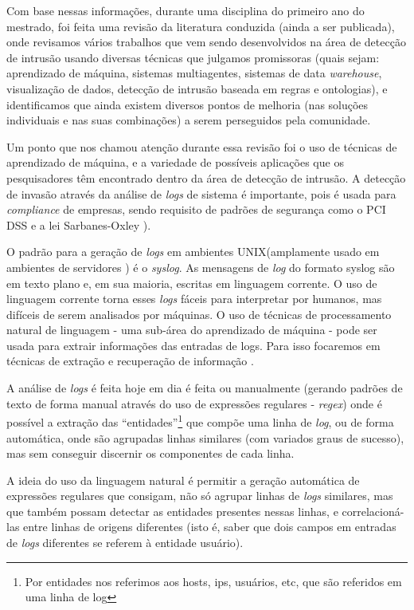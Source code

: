 \documentclass[
	12pt,				%
	openright,			%
	twoside,			%
	a4paper,			%
	english,			%
	french,				%
	spanish,			%
	brazil,				%
	]{abntex2}
\begin{document}
Com base nessas informações, durante uma disciplina do primeiro ano do mestrado, foi feita uma revisão da literatura conduzida (ainda a ser publicada), onde revisamos vários trabalhos que vem sendo desenvolvidos na área de detecção de intrusão usando diversas técnicas que julgamos promissoras (quais sejam: aprendizado de máquina, sistemas multiagentes, sistemas de data \emph{warehouse}, visualização de dados, detecção de intrusão baseada em regras e ontologias), e identificamos que ainda existem diversos pontos de melhoria (nas soluções individuais e nas suas combinações) a serem perseguidos pela comunidade.

Um ponto que nos chamou atenção durante essa revisão foi o uso de técnicas de aprendizado de máquina, e a variedade de possíveis aplicações que os pesquisadores têm encontrado dentro da área de detecção de intrusão. A detecção de invasão através da análise de \emph{logs} de sistema é importante, pois é usada para \emph{compliance} de empresas, sendo requisito de padrões de segurança como o PCI DSS e a lei Sarbanes-Oxley \cite{prakhar2012log}).

O padrão para a geração de \emph{logs} em ambientes UNIX\texttrademark (amplamente usado em ambientes de servidores \cite{w3techs-osusage}) é o \emph{syslog}. As mensagens de \emph{log} do formato syslog são em texto plano e, em sua maioria, escritas em linguagem corrente. O uso de linguagem corrente torna esses \emph{logs} fáceis para interpretar por humanos, mas difíceis de serem analisados por máquinas. O uso de técnicas de processamento natural de linguagem - uma sub-área do aprendizado de máquina - pode ser usada para extrair informações das entradas de logs. Para isso focaremos em técnicas de extração e recuperação de informação \cite{bird2009natural,manning2008introduction}.

A análise de \emph{logs} é feita hoje em dia é feita ou manualmente (gerando padrões de texto de forma manual através do uso de expressões regulares - \emph{regex}) onde é possível a extração das ``entidades''\footnote{Por entidades nos referimos aos hosts, ips, usuários, etc, que são referidos em uma linha de log} que compõe uma linha de \emph{log}, ou de forma automática, onde são agrupadas linhas similares (com variados graus de sucesso), mas sem conseguir discernir os componentes de cada linha.

A ideia do uso da linguagem natural é permitir a geração automática de expressões regulares que consigam, não só agrupar linhas de \emph{logs} similares, mas que também possam detectar as entidades presentes nessas linhas, e correlacioná-las entre linhas de origens diferentes (isto é, saber que dois campos em entradas de \emph{logs} diferentes se referem à entidade usuário).
\end{document}
